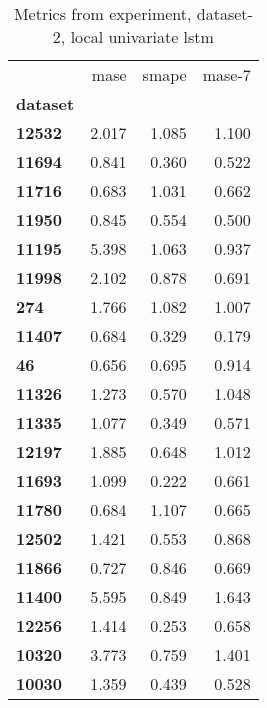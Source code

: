 \begin{table}[h]
\centering
\caption{Metrics from experiment, dataset-2, local univariate lstm}
\label{table:local-univariate-lstm-dataset-2}
\begin{tabular}{lrrr}
\toprule
{} &   mase &  smape &  mase-7 \\
\textbf{dataset} &        &        &         \\
\midrule
\textbf{12532  } &  2.017 &  1.085 &   1.100 \\
\textbf{11694  } &  0.841 &  0.360 &   0.522 \\
\textbf{11716  } &  0.683 &  1.031 &   0.662 \\
\textbf{11950  } &  0.845 &  0.554 &   0.500 \\
\textbf{11195  } &  5.398 &  1.063 &   0.937 \\
\textbf{11998  } &  2.102 &  0.878 &   0.691 \\
\textbf{274    } &  1.766 &  1.082 &   1.007 \\
\textbf{11407  } &  0.684 &  0.329 &   0.179 \\
\textbf{46     } &  0.656 &  0.695 &   0.914 \\
\textbf{11326  } &  1.273 &  0.570 &   1.048 \\
\textbf{11335  } &  1.077 &  0.349 &   0.571 \\
\textbf{12197  } &  1.885 &  0.648 &   1.012 \\
\textbf{11693  } &  1.099 &  0.222 &   0.661 \\
\textbf{11780  } &  0.684 &  1.107 &   0.665 \\
\textbf{12502  } &  1.421 &  0.553 &   0.868 \\
\textbf{11866  } &  0.727 &  0.846 &   0.669 \\
\textbf{11400  } &  5.595 &  0.849 &   1.643 \\
\textbf{12256  } &  1.414 &  0.253 &   0.658 \\
\textbf{10320  } &  3.773 &  0.759 &   1.401 \\
\textbf{10030  } &  1.359 &  0.439 &   0.528 \\
\bottomrule
\end{tabular}
\end{table}
